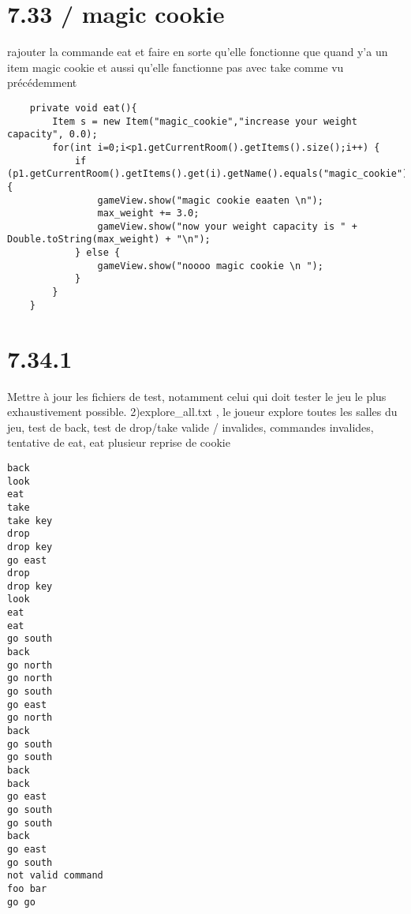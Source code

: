 \documentclass[a4paper , 10pt]{article}
\begin{document}
\section{7.33 / magic cookie}
rajouter la commande eat et faire en sorte qu'elle fonctionne que quand y'a un item magic cookie et aussi qu'elle fanctionne pas avec take comme vu précédemment 
\begin{verbatim}
    private void eat(){
        Item s = new Item("magic_cookie","increase your weight capacity", 0.0);
        for(int i=0;i<p1.getCurrentRoom().getItems().size();i++) {
            if (p1.getCurrentRoom().getItems().get(i).getName().equals("magic_cookie")) {
                gameView.show("magic cookie eaaten \n");
                max_weight += 3.0;
                gameView.show("now your weight capacity is " + Double.toString(max_weight) + "\n");
            } else {
                gameView.show("noooo magic cookie \n ");
            }
        }
    }
\end{verbatim}


\section{7.34.1}
\quad Mettre à jour les fichiers de test, notamment celui qui doit tester le jeu le plus exhaustivement possible.
2)explore\_all.txt , le joueur explore toutes les salles du jeu, test de back, test de drop/take valide / invalides, commandes invalides, tentative de eat, eat plusieur reprise de cookie

\begin{verbatim}
back
look
eat
take
take key
drop
drop key
go east
drop
drop key
look
eat
eat
go south
back
go north
go north
go south
go east
go north
back
go south
go south
back
back
go east
go south
go south
back
go east
go south
not valid command
foo bar
go go

\end{verbatim}
\end{document}

